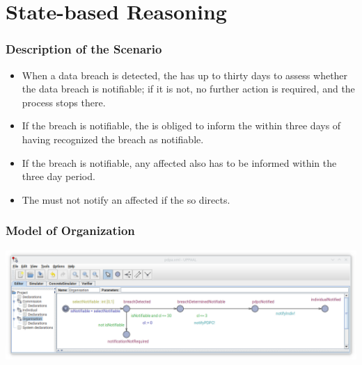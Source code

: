\documentclass{beamer}
\begin{document}
\section{State-based Reasoning}



\begin{frame}[fragile]\frametitle{Description of the Scenario}
\begin{itemize}
\item When a data breach is detected, the  has up to thirty days to
  assess whether the data breach is notifiable; if it is not, no further
  action is required, and the process stops there. 
\item If the breach is notifiable, the  is obliged to inform the
   within three days of having recognized the breach as notifiable.
\item If the breach is notifiable, any affected  also has to be
  informed within the three day period.
\item The  must not notify an affected  if the
   so directs.
\end{itemize}

\end{frame}

\begin{frame}[fragile]\frametitle{Model of Organization}

  \begin{center}
    \includegraphics[width=1\textwidth]{../Figures/organization.png}
  \end{center}


\end{frame}
\end{document}
